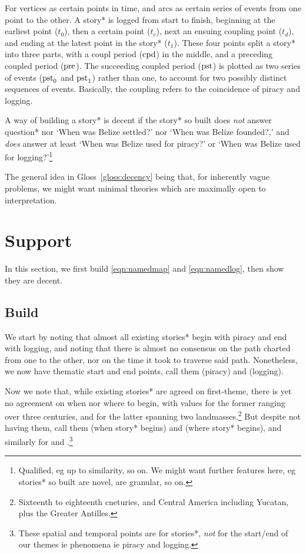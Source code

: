 	For vertices as certain points in time, and arcs as certain series of events from one point to the other. A story* is logged from start to finish, beginning at the earliest point (\(t_0\)), then a certain  point (\(t_c\)), next an ensuing coupling point (\(t_d\)), and ending at the latest point in the story* (\(t_1\)). These four points split a story* into three parts, with a coupl period (\(\operatorname{cpd}\)) in the middle, and a preceding coupled period (\(\operatorname{pre}\)). The succeeding coupled period (\(\operatorname{pst}\)) is plotted as two series of events (\(\operatorname{pst}_0\) and \(\operatorname{pst}_1\)) rather than one, to account for two possibly distinct sequences of events. Basically, the coupling refers to the coincidence of piracy and logging.	
	\begin{gloss}
	\label{gloss:decency}
		A way of building a story* is decent if the story* so built does \emph{not} answer question* nor `When was Belize settled?' nor `When was Belize founded?,' and \emph{does} answer at least `When was Belize used for piracy?' or `When was Belize used for logging?'\footnote{Qualified, eg up to similarity, so on. We might want further features here, eg stories* so built are novel, are granular, so on.}
	\end{gloss}
	
	The general idea in Gloss~\ref{gloss:decency} being that, for inherently vague problems, we might want minimal theories which are maximally open to interpretation.
%
%
%
\section{Support}
\label{s:support}
	In this section, we first build \ref{eqn:namedmap} and \ref{eqn:namedlog}, then show they are decent.
	\subsection{Build}
	\label{ss:build}
		We start by noting that almost all existing stories* begin with piracy and end with logging, and noting that there is almost no consensus on the path charted from one to the other, nor on the time it took to traverse said path. Nonetheless, we now have thematic start and end points, call them  (piracy) and  (logging).
		
		Now we note that, while existing stories* are agreed on first-theme, there is yet no agreement on when nor where to begin, with values for the former ranging over three centuries, and for the latter spanning two landmasses.\footnote{Sixteenth to eighteenth cneturies, and Central America including Yucatan, plus the Greater Antilles.} But despite not having them, call them  (when story* begins) and  (where story* begins), and similarly for  and .\footnote{These spatial and temporal points are for stories*, \emph{not} for the start/end of our themes ie phenomena ie piracy and logging.}
